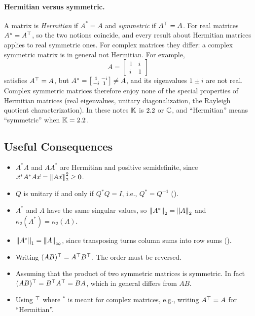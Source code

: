 \paragraph{Hermitian versus symmetric.} A matrix is \emph{Hermitian} if $A^\ast = A$ and \emph{symmetric} if $A^\top = A$. For real matrices $A^\ast = A^\top$, so the two notions coincide, and every result about Hermitian matrices applies to real symmetric ones. For complex matrices they differ: a complex symmetric matrix is in general not Hermitian. For example,
\begin{equation}
  A = \begin{bmatrix} 1 & i \\ i & 1 \end{bmatrix}
\end{equation}
satisfies $A^\top = A$, but $A^\ast = \begin{bsmallmatrix} 1 & -i \\ -i & 1 \end{bsmallmatrix} \ne A$, and its eigenvalues $1 \pm i$ are not real. Complex symmetric matrices therefore enjoy none of the special properties of Hermitian matrices (real eigenvalues, unitary diagonalization, the Rayleigh quotient characterization). In these notes $\mathbb{K}$ is $2.2$ or $\mathbb{C}$, and ``Hermitian'' means ``symmetric'' when $\mathbb{K} = 2.2$.

\subsection{Useful Consequences}

\begin{itemize}
  \item $A^\ast A$ and $AA^\ast$ are Hermitian and positive semidefinite, since $\vec{x}^\ast A^\ast A\vec{x} = \left\lVert A\vec{x} \right\rVert_2^2 \ge 0$.
  \item $Q$ is unitary if and only if $Q^\ast Q = I$, i.e., $Q^\ast = Q^{-1}$ ().
  \item $A^\ast$ and $A$ have the same singular values, so $\left\lVert A^\ast \right\rVert_2 = \left\lVert A \right\rVert_2$ and $\kappa_2(A^\ast) = \kappa_2(A)$.
  \item $\left\lVert A^\ast \right\rVert_1 = \left\lVert A \right\rVert_\infty$, since transposing turns column sums into row sums ().
\end{itemize}

\begin{remark}
  \begin{itemize}
    \item Writing $(AB)^\top = A^\top B^\top$. The order must be reversed.
    \item Assuming that the product of two symmetric matrices is symmetric. In fact $(AB)^\top = B^\top A^\top = BA$, which in general differs from $AB$.
    \item Using $^\top$ where $^\ast$ is meant for complex matrices, e.g., writing $A^\top = A$ for ``Hermitian''.
  \end{itemize}
\end{remark}

